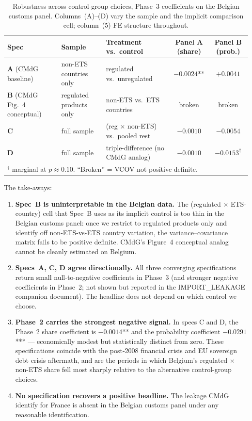 \begin{table}[H]
    \centering
    \caption{Robustness across control-group choices, Phase~3 coefficients on the Belgian customs panel. Columns~(A)--(D) vary the sample and the implicit comparison cell; column~(5) FE structure throughout.}
    \label{tab:cmdg_robust}
    \footnotesize
    \begin{tabular}{lllcc}
        \toprule
        Spec & Sample & Treatment vs.\ control & Panel A (share) & Panel B (prob.) \\
        \midrule
        \textbf{A} (CMdG baseline) & non-ETS countries only & regulated vs.\ unregulated & $-0.0024$** & $+0.0041$ \\
        \textbf{B} (CMdG Fig.\ 4 conceptual) & regulated products only & non-ETS vs.\ ETS countries & broken & broken \\
        \textbf{C} & full sample & (reg $\times$ non-ETS) vs.\ pooled rest & $-0.0010$ & $-0.0054$ \\
        \textbf{D} & full sample & triple-difference (no CMdG analog) & $-0.0010$ & $-0.0153^{\dagger}$ \\
        \bottomrule
        \multicolumn{5}{l}{\footnotesize $^{\dagger}$ marginal at $p \approx 0.10$. ``Broken'' = VCOV not positive definite.}
    \end{tabular}
\end{table}

The take-aways:

\begin{enumerate}
    \item \textbf{Spec~B is uninterpretable in the Belgian data.} The (regulated $\times$ ETS-country) cell that Spec~B uses as its implicit control is too thin in the Belgian customs panel: once we restrict to regulated products only and identify off non-ETS-vs-ETS country variation, the variance--covariance matrix fails to be positive definite. CMdG's Figure~4 conceptual analog cannot be cleanly estimated on Belgium.
    \item \textbf{Specs~A, C, D agree directionally.} All three converging specifications return small null-to-negative coefficients in Phase~3 (and stronger negative coefficients in Phase~2; not shown but reported in the IMPORT\_LEAKAGE companion document). The headline does not depend on which control we choose.
    \item \textbf{Phase~2 carries the strongest negative signal.} In specs C and D, the Phase~2 share coefficient is $-0.0014$** and the probability coefficient $-0.0291$*** --- economically modest but statistically distinct from zero. These specifications coincide with the post-2008 financial crisis and EU sovereign debt crisis aftermath, and are the periods in which Belgium's regulated $\times$ non-ETS share fell most sharply relative to the alternative control-group choices.
    \item \textbf{No specification recovers a positive headline.} The leakage CMdG identify for France is absent in the Belgian customs panel under any reasonable identification.
\end{enumerate}

